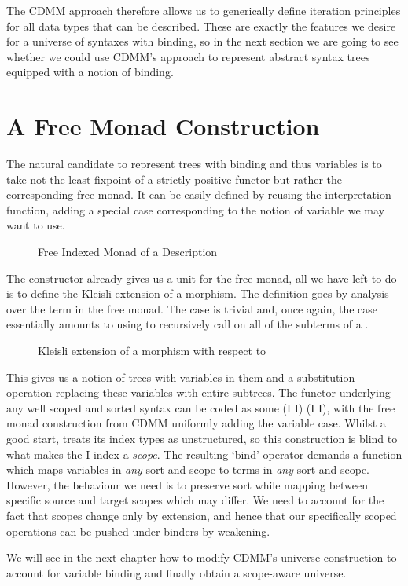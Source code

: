 The CDMM approach therefore allows us to generically define iteration
principles for all data types that can be described. These are exactly
the features we desire for a universe of syntaxes with binding, so in
the next section we are going to see whether we could use CDMM's approach
to represent abstract syntax trees equipped with a notion of binding.

\section{A Free Monad Construction}

The natural candidate to represent trees with binding and thus variables
is to take not the least fixpoint of a strictly positive functor but
rather the corresponding free monad. It can be easily defined by reusing
the interpretation function, adding a special case corresponding to the
notion of variable we may want to use.

\begin{figure}[h]
  \caption{Free Indexed Monad of a Description\label{fig:datafreemonad}}
\end{figure}

The  constructor already gives us a unit for the free monad,
all we have left to do is to define the Kleisli extension of a morphism.
The definition goes by analysis over the term in the free monad. The
 case is trivial and, once again, the  case
essentially amounts to using  to recursively call 
on all of the subterms of a .

\begin{figure}[h]
  \caption{Kleisli extension of a morphism with respect to ~\label{fig:datakleisli}}
\end{figure}

This gives us a notion of trees with variables in them and a substitution
operation replacing these variables with entire subtrees.
%
The functor underlying any well scoped and sorted syntax can be coded as
some { (I \AR{$\times$}  I) (I \AR{$\times$}  I)},
with the free monad construction from CDMM uniformly adding the variable
case. Whilst a good start,  treats its index types as unstructured,
so this construction is blind to what makes the { I} index a
\emph{scope}. The resulting `bind' operator demands a function which maps
variables in \emph{any} sort and scope to terms in \emph{any} sort
and scope. However, the behaviour we need is to preserve sort while mapping
between specific source and target scopes which may differ. We need to
account for the fact that scopes change only by extension, and hence that our
specifically scoped operations can be pushed under binders by weakening.

We will see in the next chapter how to modify CDMM's universe construction
to account for variable binding and finally obtain a scope-aware universe.
